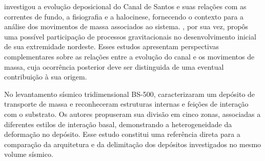  investigou a evolução deposicional do Canal de Santos e suas relações com as correntes de fundo, a fisiografia e a halocinese, fornecendo o contexto para a análise dos movimentos de massa associados ao sistema. , por sua vez, propôs uma possível participação de processos gravitacionais no desenvolvimento inicial de sua extremidade nordeste. Esses estudos apresentam perspectivas complementares sobre as relações entre a evolução do canal e os movimentos de massa, cuja ocorrência posterior deve ser distinguida de uma eventual contribuição à sua origem.

No levantamento sísmico tridimensional BS-500,  caracterizaram um depósito de transporte de massa e reconheceram estruturas internas e feições de interação com o substrato. Os autores propuseram sua divisão em cinco zonas, associadas a diferentes estilos de interação basal, demonstrando a heterogeneidade da deformação no depósito. Esse estudo constitui uma referência direta para a comparação da arquitetura e da delimitação dos depósitos investigados no mesmo volume sísmico.
